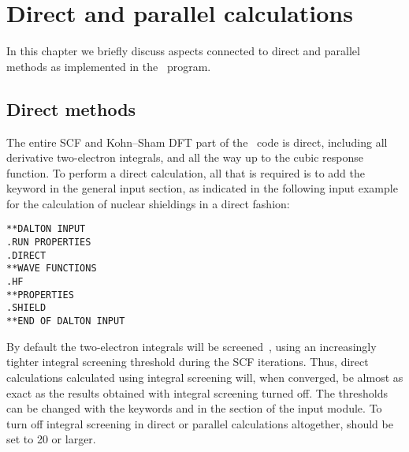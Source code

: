 \chapter{Direct and parallel calculations}\label{ch:dirpar}

In this chapter we briefly discuss aspects connected to
direct and parallel
methods as implemented in the \dalton\ program. 

\section{Direct methods}\label{sec:direct}

\begin{center}
\end{center}

The entire SCF and Kohn--Sham DFT part
of the \dalton\ code is direct, including all derivative two-electron
integrals, and all the way up to the cubic response function. To
perform a direct calculation, all that is
required is to add the 
keyword  in the general input section, as indicated in the
following input example for the calculation of nuclear
shieldings in a
direct fashion:

\begin{verbatim}
**DALTON INPUT
.RUN PROPERTIES
.DIRECT
**WAVE FUNCTIONS
.HF
**PROPERTIES
.SHIELD
**END OF DALTON INPUT
\end{verbatim}

By default the two-electron integrals will be
screened~\cite{krdjpnhatshjajpdthjcp108}, using an increasingly
tighter integral screening threshold during the SCF iterations. Thus,
direct calculations calculated using integral screening will, when
converged, be almost as exact as the results obtained with integral
screening turned off. The thresholds can be changed with the
keywords  and  in the  section of the  input module. To
turn off integral screening in direct or parallel calculations
altogether,  should be set to 20 or larger.


